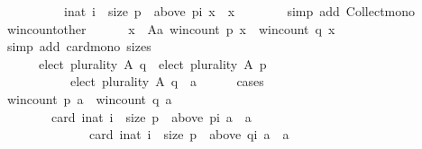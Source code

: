 \begin{isabellebody}
\ \ \ \ \ \ \ \ \ \ {\isacharbraceleft}{\kern0pt}i{\isacharcolon}{\kern0pt}{\isacharcolon}{\kern0pt}nat{\isachardot}{\kern0pt}\ i\ {\isacharless}{\kern0pt}\ size\ p\ {\isasymand}\ above\ {\isacharparenleft}{\kern0pt}p{\isacharbang}{\kern0pt}i{\isacharparenright}{\kern0pt}\ x\ {\isacharequal}{\kern0pt}\ {\isacharbraceleft}{\kern0pt}x{\isacharbraceright}{\kern0pt}{\isacharbraceright}{\kern0pt}{\isachardoublequoteclose}\isanewline
\ \ \ \ \ \ \isamarkupfalse%
\ {\isacharparenleft}{\kern0pt}simp\ add{\isacharcolon}{\kern0pt}\ Collect{\isacharunderscore}{\kern0pt}mono{\isacharparenright}{\kern0pt}\isanewline
\ \ \ \ \isamarkupfalse%
\ win{\isacharunderscore}{\kern0pt}count{\isacharunderscore}{\kern0pt}other{\isacharcolon}{\kern0pt}\isanewline
\ \ \ \ \ \ {\isachardoublequoteopen}{\isasymforall}x\ {\isasymin}\ A{\isacharminus}{\kern0pt}{\isacharbraceleft}{\kern0pt}a{\isacharbraceright}{\kern0pt}{\isachardot}{\kern0pt}\ win{\isacharunderscore}{\kern0pt}count\ p\ x\ {\isasymge}\ win{\isacharunderscore}{\kern0pt}count\ q\ x{\isachardoublequoteclose}\isanewline
\ \ \ \ \ \ \isamarkupfalse%
\ {\isacharparenleft}{\kern0pt}simp\ add{\isacharcolon}{\kern0pt}\ card{\isacharunderscore}{\kern0pt}mono\ sizes{\isacharparenright}{\kern0pt}\isanewline
\ \ \ \ \isamarkupfalse%
\isanewline
\ \ \ \ \ \ {\isachardoublequoteopen}elect\ plurality\ A\ q\ {\isacharequal}{\kern0pt}\ elect\ plurality\ A\ p\ {\isasymor}\isanewline
\ \ \ \ \ \ \ \ \ \ \ elect\ plurality\ A\ q\ {\isacharequal}{\kern0pt}\ {\isacharbraceleft}{\kern0pt}a{\isacharbraceright}{\kern0pt}{\isachardoublequoteclose}\isanewline
\ \ \ \ \isamarkupfalse%
\ cases\isanewline
\ \ \ \ \ \ \isamarkupfalse%
\ {\isachardoublequoteopen}win{\isacharunderscore}{\kern0pt}count\ p\ a\ {\isacharequal}{\kern0pt}\ win{\isacharunderscore}{\kern0pt}count\ q\ a{\isachardoublequoteclose}\isanewline
\ \ \ \ \ \ \isamarkupfalse%
\isanewline
\ \ \ \ \ \ \ \ {\isachardoublequoteopen}card\ {\isacharbraceleft}{\kern0pt}i{\isacharcolon}{\kern0pt}{\isacharcolon}{\kern0pt}nat{\isachardot}{\kern0pt}\ i\ {\isacharless}{\kern0pt}\ size\ p\ {\isasymand}\ above\ {\isacharparenleft}{\kern0pt}p{\isacharbang}{\kern0pt}i{\isacharparenright}{\kern0pt}\ a\ {\isacharequal}{\kern0pt}\ {\isacharbraceleft}{\kern0pt}a{\isacharbraceright}{\kern0pt}{\isacharbraceright}{\kern0pt}\ {\isacharequal}{\kern0pt}\isanewline
\ \ \ \ \ \ \ \ \ \ \ \ \ \ card\ {\isacharbraceleft}{\kern0pt}i{\isacharcolon}{\kern0pt}{\isacharcolon}{\kern0pt}nat{\isachardot}{\kern0pt}\ i\ {\isacharless}{\kern0pt}\ size\ p\ {\isasymand}\ above\ {\isacharparenleft}{\kern0pt}q{\isacharbang}{\kern0pt}i{\isacharparenright}{\kern0pt}\ a\ {\isacharequal}{\kern0pt}\ {\isacharbraceleft}{\kern0pt}a{\isacharbraceright}{\kern0pt}{\isacharbraceright}{\kern0pt}{\isachardoublequoteclose}\isanewline

\end{isabellebody}

